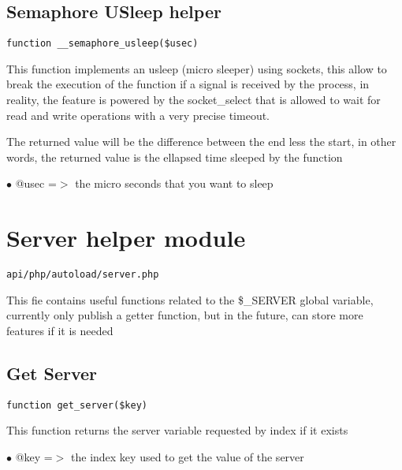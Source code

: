 \documentclass[a4paper]{book}
\begin{document}
\hypertarget{toc236}{}
\subsection{Semaphore USleep helper}

\begin{lstlisting}
function __semaphore_usleep($usec)
\end{lstlisting}

This function implements an usleep (micro sleeper) using sockets, this
allow to break the execution of the function if a signal is received by
the process, in reality, the feature is powered by the socket\_select that
is allowed to wait for read and write operations with a very precise
timeout.

The returned value will be the difference between the end less the start,
in other words, the returned value is the ellapsed time sleeped by the
function

\begin{compactitem}
\item[\color{myblue}$\bullet$] @usec =$>$ the micro seconds that you want to sleep
\end{compactitem}

\hypertarget{toc237}{}
\section{Server helper module}

\begin{lstlisting}
api/php/autoload/server.php
\end{lstlisting}

This fie contains useful functions related to the \$\_SERVER global variable, currently only publish
a getter function, but in the future, can store more features if it is needed

\hypertarget{toc238}{}
\subsection{Get Server}

\begin{lstlisting}
function get_server($key)
\end{lstlisting}

This function returns the server variable requested by index if it exists

\begin{compactitem}
\item[\color{myblue}$\bullet$] @key =$>$ the index key used to get the value of the server
\end{compactitem}
\end{document}
